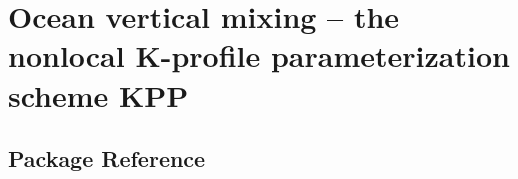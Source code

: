 \section{Ocean vertical mixing -- 
the nonlocal K-profile parameterization scheme KPP
\label{sec:kpp}}
\subsection{Package Reference}

